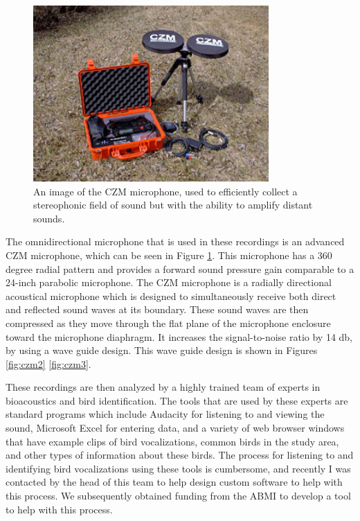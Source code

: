 \documentclass[12pt,oneside]{book}
\begin{document}
\begin{figure}[h]
\centering
\includegraphics[width=90mm]{figures/czm1.jpg}
\caption{An image of the CZM microphone, used to efficiently collect a
stereophonic field of sound but with the ability to amplify distant sounds.}
\label{fig:czm1}
\end{figure}

The omnidirectional microphone that is used in these recordings is an
advanced CZM microphone, which can be seen in Figure \ref{fig:czm1}.
This microphone has a 360 degree radial pattern and provides a forward
sound pressure gain comparable to a 24-inch parabolic microphone.  The
CZM microphone is a radially directional acoustical microphone which
is designed to simultaneously receive both direct and reflected sound
waves at its boundary.  These sound waves are then compressed as they
move through the flat plane of the microphone enclosure toward the
microphone diaphragm.  It increases the signal-to-noise ratio by 14
db, by using a wave guide design.  This wave guide design is shown in
Figures \ref{fig:czm2} \ref{fig:czm3}.

These recordings are then analyzed by a highly trained team of experts
in bioacoustics and bird identification.  The tools that are used by
these experts are standard programs which include Audacity
\cite{mazzoni2002audacity} for listening to and viewing the sound, Microsoft
Excel for entering data, and a variety of web browser windows that
have example clips of bird vocalizations, common birds in the study
area, and other types of information about these birds.  The process
for listening to and identifying bird vocalizations using these tools
is cumbersome, and recently I was contacted by the head of this team
to help design custom software to help with this process.  We
subsequently obtained funding from the ABMI to develop a tool to help
with this process.
\end{document}
